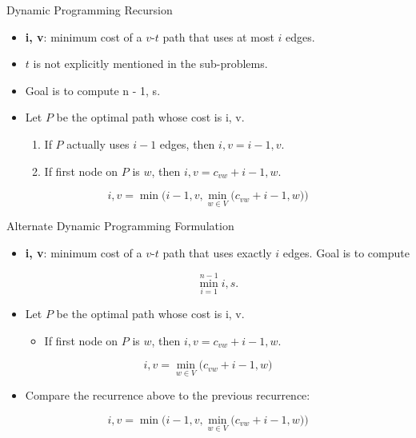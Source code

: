   \begin{frame}[fragile]{Dynamic Programming Recursion}

  \begin{itemize}
  \item \textbf{{i, v}}: minimum cost of a $v$-$t$ path that uses \alert{at
      most} $i$ edges.
  \item $t$ is not explicitly mentioned in the sub-problems.
  \item Goal is to compute {n - 1, s}.
     
  \end{itemize}

  \begin{itemize}
  \item Let $P$ be the optimal path whose cost is {i, v}. 
    \begin{enumerate}
    \item If $P$ actually uses $i - 1$ edges, then ${i, v} = {i - 1, v}$.
    \item If first node on $P$ is $w$, then ${i, v} = c_{vw} +
      {i - 1, w}$.
    \end{enumerate}
  \end{itemize}
   
  $${i, v} = \min \bigg( {i - 1, v}, \min_{w \in V} \big(c_{vw} +
      {i - 1, w} \big) \bigg)$$
\end{frame}

   \begin{frame}[fragile]{Alternate Dynamic Programming Formulation}

  \begin{itemize}
  \item \textbf{{i, v}}: minimum cost of a $v$-$t$ path that uses
    \alert{exactly} $i$ edges. Goal is to compute 
     
    $$ \min_{i=1}^{n-1}   {i, s}.$$
     
  \end{itemize}
  \begin{itemize}
  \item Let $P$ be the optimal path whose cost is {i, v}. 
    \begin{itemize}
    \item If first node on $P$ is $w$, then ${i, v} = c_{vw} +
      {i - 1, w}$.
    \end{itemize}
  \end{itemize}
   
  $${i, v} = \min_{w \in V} \big(c_{vw} +
  {i - 1, w} \big) $$
   
  \begin{itemize}
  \item Compare the recurrence above to the previous recurrence:
  \end{itemize}
  $${i, v} = \min \bigg( {i - 1, v}, \min_{w \in V} \big(c_{vw} +
  {i - 1, w} \big) \bigg)$$
\end{frame}


